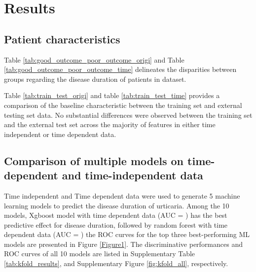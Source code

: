 \documentclass[final,1p,times,authoryear]{elsarticle}
\begin{document}
\section{Results}\label{Results}

\subsection{Patient characteristics}\label{PatientCharacteristics}

Table \ref{tab:good_outcome_poor_outcome_origi} and Table \ref{tab:good_outcome_poor_outcome_time} delineates the disparities between groups regarding the disease duration of patients in dataset. 

Table \ref{tab:train_test_origi} and table \ref{tab:train_test_time} provides a comparison of the baseline characteristic between the training set and external testing set data. No substantial differences were observed between the training set and the external test set across the majority of features in either time independent or time dependent data.



\subsection{Comparison of multiple models on time-dependent and time-independent data}\label{ModelComparison}

Time independent and Time dependent data were used to generate 5 machine learning models to predict the disease duration of urticaria. Among the 10 models, Xgboost model with time dependent data (AUC = )  has the best predictive effect for disease duration, followed by random forest with time dependent data (AUC = ) the ROC curves for the top three best-performing ML models are presented in Figure \ref{Figure1}. The discriminative performances and ROC curves of all 10 models are listed in Supplementary Table \ref{tab:kfold_results}, and Supplementary Figure \ref{fig:kfold_all}, respectively.
\end{document}
